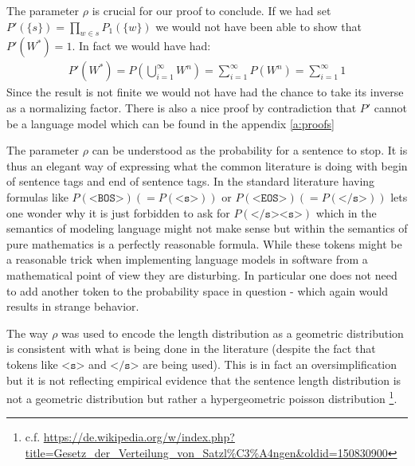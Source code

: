 \documentclass[•]{book}
\begin{document}
\begin{remark}
The parameter $\rho$ is crucial for our proof to conclude.
If we had set $P'(\{s\}) = \prod_{w\in s}P_1(\{w\})$ we would not have been able to show that $P'(W^{*})=1$. 
In fact we would have had:
\begin{align}
P'(W^{*})= P(\bigcup_{i=1}^\infty W^n) = \sum_{i=1}^\infty P(W^n) = \sum_{i=1}^\infty 1
\end{align}
Since the result is not finite we would not have had the chance to take its inverse as a normalizing factor. 
There is also a nice proof by contradiction that $P'$ cannot be a language model which can be found in the appendix \ref{a:proofs}

The parameter $\rho$ can be understood as the probability for a sentence to stop. 
It is thus an elegant way of expressing what the common literature is doing with begin of sentence tags and end of sentence tags.
In the standard literature having formulas like $P(\texttt{<BOS>})\left(=P(\texttt{<s>})\right)$ or $P(\texttt{<EOS>})\left(=P(\texttt{</s>})\right)$  lets one wonder why it is just forbidden to ask for $P(\texttt{</s><s>})$ which in the semantics of modeling language might not make sense but within the semantics of pure mathematics is a perfectly reasonable formula.
While these tokens might be a reasonable trick when implementing language models in software from a mathematical point of view they are disturbing.
In particular one does not need to add another token to the probability space in question - which again would results in strange behavior.   

The way $\rho$ was used to encode the length distribution as a geometric distribution is consistent with what is being done in the literature (despite the fact that tokens like $\texttt{<s>}$ and $\texttt{</s>}$ are being used). This is in fact an oversimplification but it is not reflecting empirical evidence that the sentence length distribution is not a geometric distribution but rather a hypergeometric poisson distribution \footnote{c.f. \url{https://de.wikipedia.org/w/index.php?title=Gesetz_der_Verteilung_von_Satzl\%C3\%A4ngen&oldid=150830900}}.

\end{remark}
\end{document}
